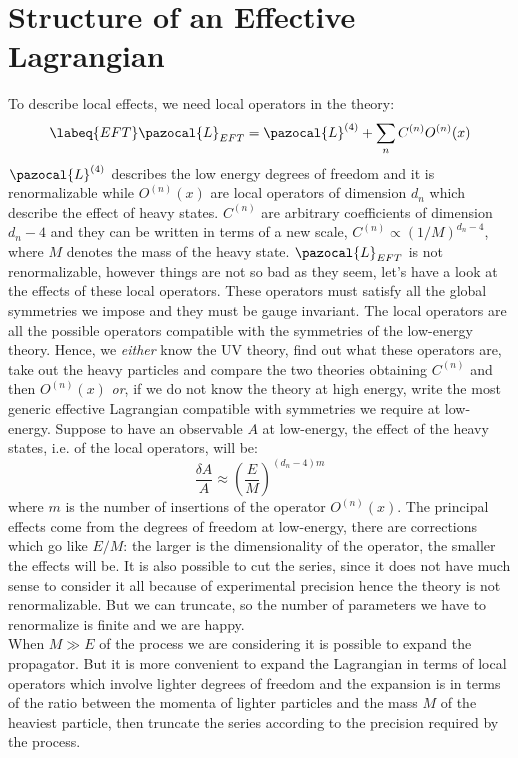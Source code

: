 \documentclass[../main.tex]{subfiles}
\begin{document}
\section{Structure of an Effective Lagrangian}
To describe local effects, we need local operators in the theory:
\begin{equation}
\labeq{EFT}
\pazocal{L}_{EFT}=\pazocal{L}^{(4)}+\sum_n C^{(n)}O^{(n)}(x)
\end{equation}
$\pazocal{L}^{(4)}$ describes the low energy degrees of freedom and it is renormalizable while $O^{(n)}(x)$ are local operators of dimension $d_n$ which describe the effect of heavy states. $C^{(n)}$ are arbitrary coefficients of dimension $d_n-4$ and they can be written in terms of a new scale, $C^{(n)}\propto(1/M)^{d_n-4}$, where $M$ denotes the mass of the heavy state. $\pazocal{L}_{EFT}$ is not renormalizable, however things are not so bad as they seem, let's have a look at the effects of these local operators. These operators must satisfy all the global symmetries we impose and they must be gauge invariant. The local operators are all the possible operators compatible with the symmetries of the low-energy theory. Hence, we \textit{either} know the UV theory, find out what these operators are, take out the heavy particles and compare the two theories obtaining $C^{(n)}$ and then $O^{(n)}(x)$ \textit{or}, if we do not know the theory at high energy, write the most generic effective Lagrangian compatible with symmetries we require at low-energy. Suppose to have an observable $A$ at low-energy, the effect of the heavy states, i.e. of the local operators, will be:
\[
\frac{\delta A}{A}\approx\left(\frac{E}{M}\right)^{(d_n-4)m}
\]
where $m$ is the number of insertions of the operator $O^{(n)}(x)$. The principal effects come from the degrees of freedom at low-energy, there are corrections which go like $E/M$: the larger is the dimensionality of the operator, the smaller the effects will be. It is also possible to cut the series, since it does not have much sense to consider it all because of experimental precision hence the theory is not renormalizable. But we can truncate, so the number of parameters we have to renormalize is finite and we are happy. \\
When $M\gg E$ of the process we are considering it is possible to expand the propagator. But it is more convenient to expand the Lagrangian in terms of local operators which involve lighter degrees of freedom and the expansion is in terms of the ratio between the momenta of lighter particles and the mass $M$ of the heaviest particle, then truncate the series according to the precision required by the process.
\end{document}
